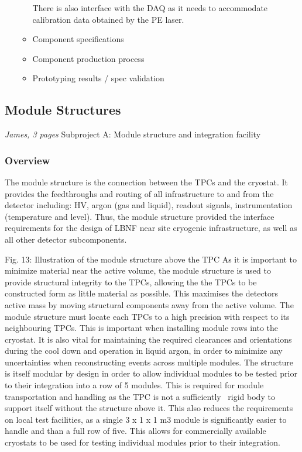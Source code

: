 \begin{itemize}
\begin{itemize}
        There is also interface with the DAQ as it needs to accommodate calibration data obtained by the PE laser.
        \item Component specifications
        \item Component production process
        \item Prototyping results / spec validation
    \end{itemize}
\end{itemize}

\subsection{Module Structures}
\label{sec:lartpc-des-modstruc}
{\it James, 3 pages}
Subproject A: Module structure and integration facility
\subsubsection{Overview}

The module structure is the connection between the TPCs and the cryostat. It provides the feedthroughs and routing of all infrastructure to and from the detector including: HV, argon (gas and liquid), readout signals, instrumentation (temperature and level). Thus, the module structure provided the interface requirements for the design of LBNF near site cryogenic infrastructure, as well as all other detector subcomponents.

Fig. 13: Illustration of the module structure above the TPC
As it is important to minimize material near the active volume, the module structure is used to provide structural integrity to the TPCs, allowing the the TPCs to be constructed form as little material as possible. This maximises the detectors active mass by moving structural components away from the active volume.
The module structure must locate each TPCs to a high precision with respect to its neighbouring TPCs. This is important when installing module rows into the cryostat. It is also vital for maintaining the required clearances and orientations during the cool down and operation in liquid argon, in order to minimize any uncertainties when reconstructing events across multiple modules.
The structure is itself modular by design in order to allow individual modules to be tested prior to their integration into a row of 5 modules. This is required for module transportation and handling as the TPC is not a sufficiently  rigid body to support itself without the structure above it. This also reduces the requirements on local test facilities, as a single 3 x 1 x 1 m3 module is significantly easier to handle and than a full row of five. This allows for commercially available cryostats to be used for testing individual modules prior to their integration.

